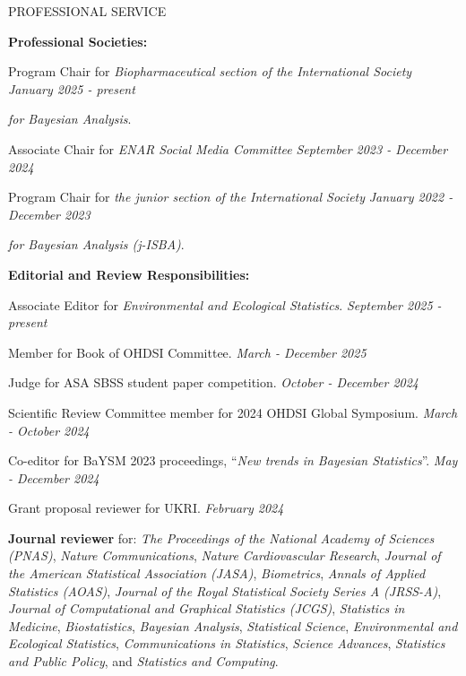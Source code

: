 \documentclass{resume} %
\newcommand{\thisYear}[1]{
	#1
}
\begin{document}
\begin{rSection}{PROFESSIONAL SERVICE}
	
	\hspace*{-0.2in}\textbf{Professional Societies:}
	
	Program Chair for \emph{Biopharmaceutical section of the International Society} \hfill {\em January 2025 - present}


	\vspace{-0.1in}
	\emph{for Bayesian Analysis}.

	
	Associate Chair for \emph{ENAR Social Media Committee}  \hfill {\em September 2023 - December 2024}

		\smallskip
	
	Program Chair for \emph{the junior section of the International Society} \hfill {\em January 2022 - December 2023}
	
	\vspace{-0.1in}
	\emph{for Bayesian Analysis (j-ISBA)}.
	
\medskip 

 \hspace*{-0.2in}\textbf{Editorial and Review Responsibilities:}
 
 Associate Editor for \emph{Environmental and Ecological Statistics}.  \hfill{\em September 2025 - present}

 Member for Book of OHDSI Committee. \hfill{\em March - December 2025}
 
 	Judge for ASA SBSS student paper competition. 	 \hfill {\em October - December 2024}
 	
 	Scientific Review Committee member for 2024 OHDSI Global Symposium. 	\hfill {\em March - October 2024}
 	
 	\smallskip 
	
 Co-editor for BaYSM 2023 proceedings, ``\emph{New trends in Bayesian Statistics}''.	\hfill {\em May - December 2024}

    \smallskip 
    
 
    Grant proposal reviewer for UKRI.	\hfill {\em February 2024}

    
    \smallskip 
    
    \textbf{Journal reviewer} for: \emph{The Proceedings of the National Academy of Sciences (PNAS)}, \emph{Nature Communications}, \emph{Nature Cardiovascular Research}, \emph{Journal of the American Statistical Association (JASA)}, \emph{Biometrics}, \emph{Annals of Applied Statistics (AOAS)}, \emph{Journal of the Royal Statistical Society Series A (JRSS-A)}, \emph{Journal of Computational and Graphical Statistics (JCGS)}, \emph{Statistics in Medicine}, \emph{Biostatistics}, \emph{Bayesian Analysis},  \emph{Statistical Science}, \emph{Environmental and Ecological Statistics}, \emph{Communications in Statistics},  \emph{Science Advances}, \emph{Statistics and Public Policy},  and \emph{Statistics and Computing}. 
    

\end{rSection}
\end{document}
